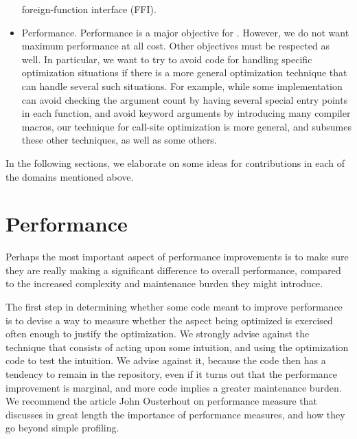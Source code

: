 \begin{itemize}
  foreign-function interface (FFI).
\item Performance.  Performance is a major objective for \sysname{}.
  However, we do not want maximum performance at all cost.  Other
  objectives must be respected as well.  In particular, we want to try
  to avoid code for handling specific optimization situations if there
  is a more general optimization technique that can handle several
  such situations.  For example, while some \commonlisp{}
  implementation can avoid checking the argument count by having
  several special entry points in each function, and avoid keyword
  arguments by introducing many compiler macros, our technique for
  call-site optimization is more general, and subsumes these other
  techniques, as well as some others.
\end{itemize}

In the following sections, we elaborate on some ideas for
contributions in each of the domains mentioned above.

\section{Performance}

Perhaps the most important aspect of performance improvements is to
make sure they are really making a significant difference to overall
performance, compared to the increased complexity and maintenance
burden they might introduce.

The first step in determining whether some code meant to improve
performance is to devise a way to measure whether the aspect being
optimized is exercised often enough to justify the optimization.  We
strongly advise against the technique that consists of acting upon
some intuition, and using the optimization code to test the
intuition.  We advise against it, because the code then has a tendency
to remain in the repository, even if it turns out that the performance
improvement is marginal, and more code implies a greater maintenance
burden.  We recommend the article \cite{10.1145/3213770}
John Ousterhout on performance measure that discusses in great length
the importance of performance measures, and how they go beyond simple
profiling.

